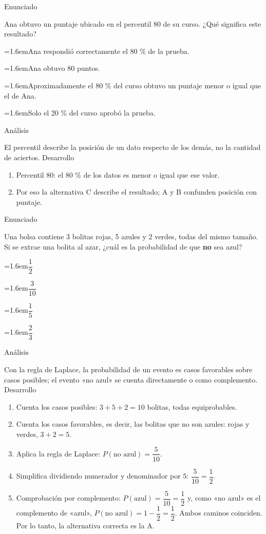 \documentclass[10pt,a4paper,twocolumn]{article}
\newcommand{\alternativa}[2]{\par\noindent\hangindent=1.6em\hangafter=1\makebox[1.6em][l]{\tecla{#1}}#2\par}
\newcommand{\clave}[1]{\par\smallskip{\sffamily\footnotesize\color{esmeralda} Clave \teclaok{#1}}\par}
\begin{document}
\begin{ejemplo}
{\sffamily\footnotesize\color{zinc500} Enunciado}\par
Ana obtuvo un puntaje ubicado en el percentil 80 de su curso. ¿Qué significa este resultado?
\alternativa{A}{Ana respondió correctamente el 80 \% de la prueba.}
\alternativa{B}{Ana obtuvo 80 puntos.}
\alternativa{C}{Aproximadamente el 80 \% del curso obtuvo un puntaje menor o igual que el de Ana.}
\alternativa{D}{Solo el 20 \% del curso aprobó la prueba.}
\clave{C}
{\sffamily\footnotesize\color{zinc500} Análisis}\par El percentil describe la posición de un dato respecto de los demás, no la cantidad de aciertos.
{\sffamily\footnotesize\color{zinc500} Desarrollo}
\begin{enumerate}
  \item Percentil 80: el 80 \% de los datos es menor o igual que ese valor.
  \item Por eso la alternativa C describe el resultado; A y B confunden posición con puntaje.
\end{enumerate}
\end{ejemplo}

\begin{ejemplo}
{\sffamily\footnotesize\color{zinc500} Enunciado}\par
Una bolsa contiene 3 bolitas rojas, 5 azules y 2 verdes, todas del mismo tamaño. Si se extrae una bolita al azar, ¿cuál es la probabilidad de que \textbf{no} sea azul?
\alternativa{A}{$\dfrac{1}{2}$}
\alternativa{B}{$\dfrac{3}{10}$}
\alternativa{C}{$\dfrac{1}{5}$}
\alternativa{D}{$\dfrac{2}{3}$}
\clave{A}
{\sffamily\footnotesize\color{zinc500} Análisis}\par Con la regla de Laplace, la probabilidad de un evento es casos favorables sobre casos posibles; el evento «no azul» se cuenta directamente o como complemento.
{\sffamily\footnotesize\color{zinc500} Desarrollo}
\begin{enumerate}
  \item Cuenta los casos posibles: $3 + 5 + 2 = 10$ bolitas, todas equiprobables.
  \item Cuenta los casos favorables, es decir, las bolitas que no son azules: rojas y verdes, $3 + 2 = 5$.
  \item Aplica la regla de Laplace: $P(\text{no azul}) = \dfrac{5}{10}$.
  \item Simplifica dividiendo numerador y denominador por $5$: $\dfrac{5}{10} = \dfrac{1}{2}$.
  \item Comprobación por complemento: $P(\text{azul}) = \dfrac{5}{10} = \dfrac{1}{2}$ y, como «no azul» es el complemento de «azul», $P(\text{no azul}) = 1 - \dfrac{1}{2} = \dfrac{1}{2}$. Ambos caminos coinciden. Por lo tanto, la alternativa correcta es la A.
\end{enumerate}
\end{ejemplo}
\end{document}
